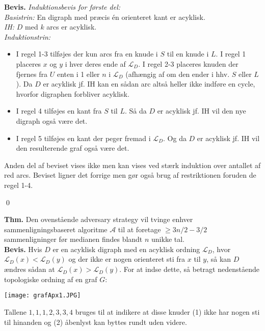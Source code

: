 \textbf{Bevis.} \textit{Induktionsbevis for første del:}\\

\textit{Basistrin:} En digraph med præcis én orienteret kant er acyklisk. \\ 

\textit{IH:} $D$ med $k$ arcs er acyklisk.\\

\textit{Induktionstrin:} 
\begin{itemize}
	\item I regel 1-3 tilføjes der kun arcs fra en knude i $S$ til en knude i $L$. I regel 1 placeres $x$ og $y$ i hver deres ende af $\mathcal{L}_D$. I regel 2-3 placeres knuden der fjernes fra $U$ enten i 1 eller $n$ i $\mathcal{L}_D$ (afhængig af om den ender i hhv. $S$ eller $L$ ). Da $D$ er acyklisk jf. IH kan en sådan arc altså heller ikke indføre en cycle, hvorfor digraphen forbliver acyklisk.
	\item I regel 4 tilføjes en kant fra $S$ til $L$. Så da $D$ er acyklisk jf. IH vil den nye digraph også være det. 
	\item I regel 5 tilføjes en kant der peger fremad i $\mathcal{L}_D$. Og da $D$ er acyklisk jf. IH vil den resulterende graf også være det.  
\end{itemize}
Anden del af beviset vises ikke men kan vises ved stærk induktion over antallet af red arcs. Beviset ligner det forrige men gør også brug af restriktionen foruden de regel 1-4. 
\begin{flushright}
	\qed
\end{flushright}

\textbf{Thm.} Den ovenstående adversary strategy vil tvinge enhver sammenligningsbaseret algoritme $\mathcal{A}$ til at foretage $\ge 3n/2-3/2$ sammenligninger før medianen findes blandt $n$ unikke tal. \\

\textbf{Bevis.} Hvis $D$ er en acyklisk digraph med en acyklisk ordning $\mathcal{L}_D$, hvor $\mathcal{L}_D(x)<\mathcal{L}_D(y)$ og der ikke er nogen orienteret sti fra $x$ til $y$, så kan $D$ ændres sådan at $\mathcal{L}_D(x)>\mathcal{L}_D(y)$. For at indse dette, så betragt nedenstående topologiske ordning af en graf $G$:
\begin{center}
	\texttt{[image: grafApx1.JPG]}
\end{center}
Tallene $1,1,1,2,3,3,4$ bruges til at indikere at disse knuder (1) ikke har nogen sti til hinanden og (2) åbenlyst kan byttes rundt uden videre. \\

